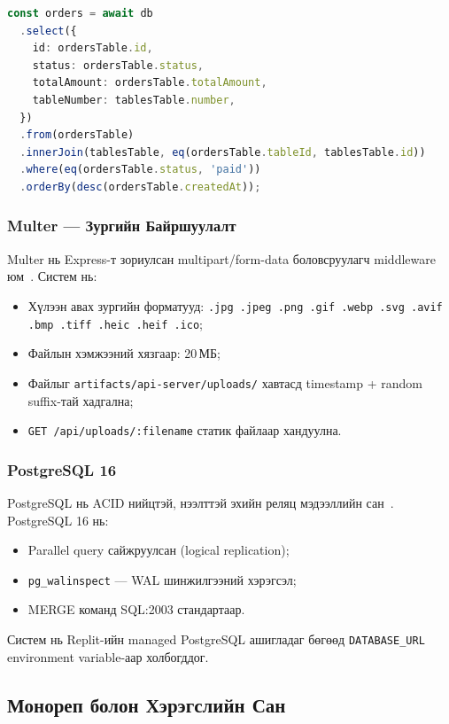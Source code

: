 \documentclass[12pt,a4paper]{article}
\begin{document}
\begin{lstlisting}[language=TypeScript, caption=Drizzle ORM query-ийн жишээ]
const orders = await db
  .select({
    id: ordersTable.id,
    status: ordersTable.status,
    totalAmount: ordersTable.totalAmount,
    tableNumber: tablesTable.number,
  })
  .from(ordersTable)
  .innerJoin(tablesTable, eq(ordersTable.tableId, tablesTable.id))
  .where(eq(ordersTable.status, 'paid'))
  .orderBy(desc(ordersTable.createdAt));
\end{lstlisting}

\subsubsection{Multer — Зургийн Байршуулалт}

Multer нь Express-т зориулсан multipart/form-data боловсруулагч
middleware юм~\cite{multer2024}. Систем нь:

\begin{itemize}
  \item Хүлээн авах зургийн форматууд: \texttt{.jpg .jpeg .png
        .gif .webp .svg .avif .bmp .tiff .heic .heif .ico};
  \item Файлын хэмжээний хязгаар: 20\,МБ;
  \item Файлыг \texttt{artifacts/api-server/uploads/} хавтасд
        timestamp + random suffix-тай хадгална;
  \item \texttt{GET /api/uploads/:filename} статик файлаар
        хандуулна.
\end{itemize}

\subsubsection{PostgreSQL 16}

PostgreSQL нь ACID нийцтэй, нээлттэй эхийн реляц мэдээллийн
сан~\cite{postgresql2024}. PostgreSQL 16 нь:

\begin{itemize}
  \item Parallel query сайжруулсан (logical replication);
  \item \texttt{pg\_walinspect} --- WAL шинжилгээний хэрэгсэл;
  \item MERGE команд SQL:2003 стандартаар.
\end{itemize}

Систем нь Replit-ийн managed PostgreSQL ашигладаг бөгөөд
\texttt{DATABASE\_URL} environment variable-аар холбогддог.

\subsection{Монореп болон Хэрэгслийн Сан}
\end{document}
